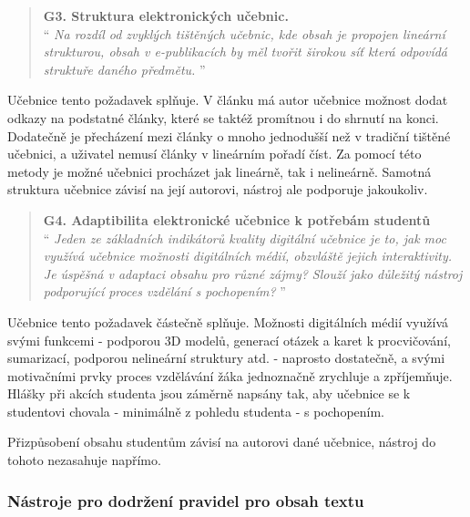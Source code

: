 \documentclass[12pt]{article}
\begin{document}
\begin{samepage}
	\begin{quotation}
		\textbf{G3. Struktura elektronických učebnic.} \\
		\enquote{\textit{
				Na rozdíl od zvyklých tištěných učebnic, kde obsah je propojen lineární strukturou, obsah v e-publikacích by měl tvořit širokou síť  která odpovídá struktuře daného předmětu.
		}}
	\end{quotation}

	Učebnice tento požadavek splňuje. V článku má autor učebnice možnost dodat odkazy na podstatné články, které se taktéž promítnou i do shrnutí na konci. Dodatečně je přecházení mezi články o mnoho jednodušší než v tradiční tištěné učebnici, a uživatel nemusí články v lineárním pořadí číst. Za pomocí této metody je možné učebnici procházet jak lineárně, tak i nelineárně. Samotná struktura učebnice závisí na její autorovi, nástroj ale podporuje jakoukoliv.
\end{samepage}

\filbreak

\begin{samepage}
	\begin{quotation}
		\textbf{G4. Adaptibilita elektronické učebnice k potřebám studentů} \\
		\enquote{\textit{
				Jeden ze základních indikátorů kvality digitální učebnice je to, jak moc využívá učebnice možnosti digitálních médií, obzvláště jejich interaktivity. Je úspěšná v adaptaci obsahu pro různé zájmy? Slouží jako důležitý nástroj podporující proces vzdělání s pochopením?
		}}
	\end{quotation}

	Učebnice tento požadavek částečně splňuje.  Možnosti digitálních médií využívá svými funkcemi - podporou 3D modelů, generací otázek a karet k procvičování, sumarizací, podporou nelineární struktury atd. - naprosto dostatečně, a svými motivačními prvky proces vzdělávání žáka jednoznačně zrychluje a zpříjemňuje. Hlášky při akcích studenta jsou záměrně napsány tak, aby učebnice se k studentovi chovala - minimálně z pohledu studenta - s pochopením.

	Přizpůsobení obsahu studentům závisí na autorovi dané učebnice, nástroj do tohoto nezasahuje napřímo.
\end{samepage}

\newpage

\subsubsection{Nástroje pro dodržení pravidel pro obsah textu}
\end{document}
